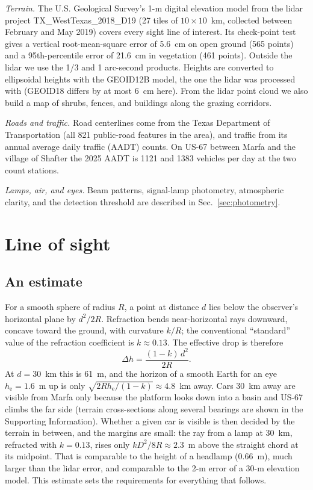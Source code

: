 \documentclass[aip,jap,amsmath,amssymb,reprint,floatfix]{revtex4-2}
\begin{document}
\textit{Terrain.} The U.S. Geological Survey's 1-m digital elevation model from the lidar project TX\_WestTexas\_2018\_D19 (27 tiles of $10\times10$~km, collected between February and May 2019) covers every sight line of interest.\cite{USGS_lidar} Its check-point test gives a vertical root-mean-square error of 5.6~cm on open ground (565 points) and a 95th-percentile error of 21.6~cm in vegetation (461 points). Outside the lidar we use the 1/3 and 1 arc-second products. Heights are converted to ellipsoidal heights with the GEOID12B model, the one the lidar was processed with (GEOID18 differs by at most 6~cm here).\cite{NGS_geoid} From the lidar point cloud we also build a map of shrubs, fences, and buildings along the grazing corridors.

\textit{Roads and traffic.} Road centerlines come from the Texas Department of Transportation (all 821 public-road features in the area), and traffic from its annual average daily traffic (AADT) counts.\cite{TxDOT} On US-67 between Marfa and the village of Shafter the 2025 AADT is 1121 and 1383 vehicles per day at the two count stations.

\textit{Lamps, air, and eyes.} Beam patterns, signal-lamp photometry, atmospheric clarity, and the detection threshold are described in Sec.~\ref{sec:photometry}.

\section{Line of sight}\label{sec:geometry}

\subsection{An estimate}

For a smooth sphere of radius $R$, a point at distance $d$ lies below the observer's horizontal plane by $d^2/2R$. Refraction bends near-horizontal rays downward, concave toward the ground, with curvature $k/R$; the conventional ``standard'' value of the refraction coefficient is $k\approx0.13$.\cite{Hirt2010} The effective drop is therefore
\begin{equation}
\Delta h = \frac{(1-k)\,d^2}{2R}.
\label{eq:drop}
\end{equation}
At $d=30$~km this is 61~m, and the horizon of a smooth Earth for an eye $h_{\mathrm e}=1.6$~m up is only $\sqrt{2Rh_{\mathrm e}/(1-k)}\approx4.8$~km away. Cars 30~km away are visible from Marfa only because the platform looks down into a basin and US-67 climbs the far side (terrain cross-sections along several bearings are shown in the Supporting Information\cite{SM}). Whether a given car is visible is then decided by the terrain in between, and the margins are small: the ray from a lamp at 30~km, refracted with $k=0.13$, rises only $kD^2/8R\approx2.3$~m above the straight chord at its midpoint. That is comparable to the height of a headlamp (0.66~m), much larger than the lidar error, and comparable to the 2-m error of a 30-m elevation model. This estimate sets the requirements for everything that follows.
\end{document}
